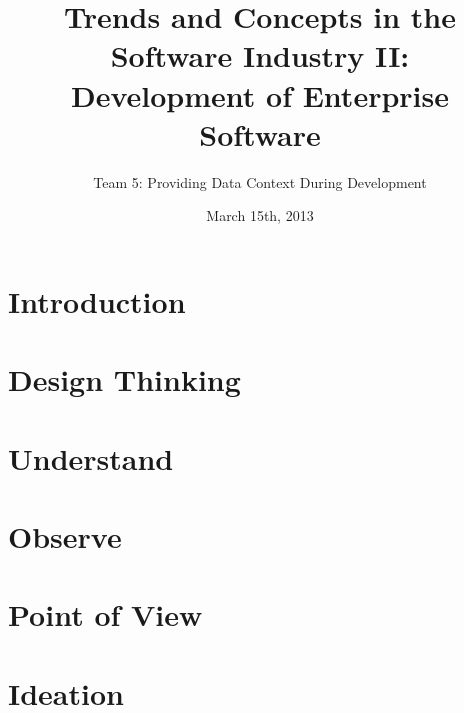 \documentclass[runningheads]{llncs}
\begin{document}
    \mainmatter
    \title{Trends and Concepts in the Software Industry II: \\ Development of Enterprise Software}
    \author{Team 5: Providing Data Context During Development}
    \date{March 15th, 2013}
    \maketitle

\newpage


\section{Introduction} 

\section{Design Thinking}

\section{Understand}

\section{Observe}

\section{Point of View}

\section{Ideation}
\end{document}
